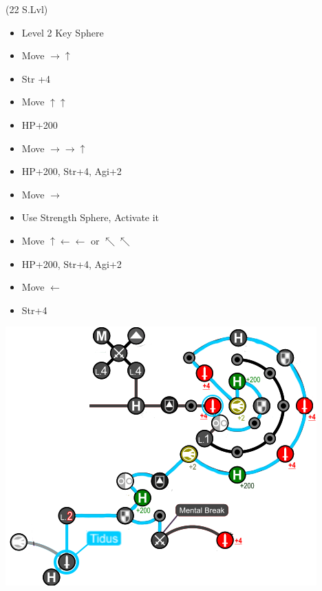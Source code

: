 \begin{spheregrid}
	\begin{itemize}
		\tidusf (22 S.Lvl)
		\begin{itemize}
			\item Level 2 Key Sphere
			\item Move $\rightarrow\uparrow$
			\item Str +4
			\item Move $\uparrow\uparrow$
			\item HP+200
			\item Move $\rightarrow\rightarrow\uparrow$
			\item HP+200, Str+4, Agi+2
			\item Move $\rightarrow$
			\item Use Strength Sphere, Activate it
			\item Move $\uparrow\leftarrow\leftarrow$ or $\nwarrow\nwarrow$
			\item HP+200, Str+4, Agi+2
			\item Move $\leftarrow$
			\item Str+4
		\end{itemize}
		\includegraphics{graphics/Tidus_post_crawler}
	\end{itemize}
\end{spheregrid}
